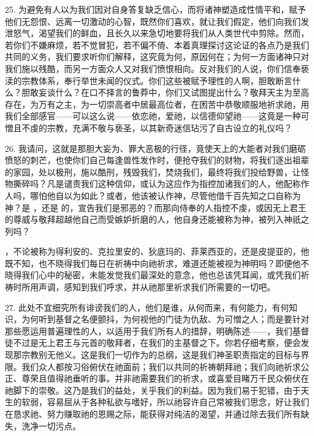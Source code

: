 25. 为避免有人以为我们因对自身答复缺乏信心，而将诸神塑造成性情平和，赋予他们无怨恨、远离一切激动的心智，既然你们喜欢，就让我们假定，他们向我们发泄怒气，渴望我们的鲜血，且长久以来急切地要将我们从人类世代中剪除。然而，若你们不嫌麻烦，若不觉冒犯，若不偏不倚、本着真理探讨这论证的各点乃是我们共同的义务，我们要求听你们解释，这究竟为何，原因何在；为何一方面诸神只对我们施以残酷，而另一方面众人又对我们愤恨相向。反对我们的人说，你们信奉亵渎的宗教体系，奉行举世未闻的仪式。你们这些被赋予理性的人啊，胆敢断言什么？胆敢妄谈什么？在口不择言的鲁莽中，你们又试图提出什么？敬拜天主为至高存在，为万有之主，为一切崇高者中居最高位者，在困苦中恭敬顺服地祈求祂，用我们全部感官——可以这么说——依恋祂，爱祂，以信德仰望祂——这竟是一种可憎且不虔的宗教，充满不敬与亵圣，以其新奇迷信玷污了自古设立的礼仪吗？\par

26. 我请问，这就是那胆大妄为、罪大恶极的行径，竟使天上的大能者对我们磨砺愤怒的刺芒，也使你们自己每逢兽性发作时，便抢夺我们的财物，将我们逐出祖辈的家园，处以极刑，施以酷刑，残毁我们，焚烧我们，最终将我们投给野兽，让怪物撕碎吗？凡是谴责我们这种信仰，或认为这应作为指控加诸我们的人，他配称作人吗，哪怕他自以为如此？或者，他该被认作神，尽管他借千百先知之口自称为神？是 ，还是 的，宣告我们是邪恶的？而那向侍奉的人指控不虔，或因无上君王的尊威与敬拜超越他自己而受嫉妒折磨的人，他自身还能被称为神，被列入神祇之列吗？\par

，不论被称为得利安的、克拉里安的、狄底玛的、菲莱西亚的，还是皮提亚的，他既不知，也不晓得我们每日在祈祷中向祂祈求，难道还能被视为神明吗？即便他不晓得我们心中的秘密，未能发觉我们最深处的意念，他也总该凭耳闻，或凭我们祈祷时所用声调，感知到我们呼求，并从祂那里祈求我们所需要的一切吧。\par

27. 此处不宜细究所有诽谤我们的人，他们是谁，从何而来，有何能力，有何知识，为何听到基督之名便颤抖，为何视他的门徒为仇敌、为可憎之人；而是要针对那些愿运用普遍理性的人，以适用于我们所有人的措辞，明确陈述——，我们基督徒不过是无上君王与元首的敬拜者，在我们的主基督之下。你若仔细考察，便会发现那宗教别无他义。这是我们一切作为的总纲，这是我们神圣职责指定的目标与界限。我们众人都按习俗俯伏在祂面前；我们以共同的祈祷朝拜祂；我们向祂祈求公正、尊荣且值得祂垂听的事。并非祂需要我们的祈求，或喜爱目睹万千民众俯伏在祂脚下的崇敬。这乃是我们的益处，关乎我们的利益。因为我们易于犯错，由于天生的软弱，容易屈从于各种私欲与嗜好，所以祂容许自己常被我们思念，好让我们在恳求祂、努力赚取祂的恩赐之际，能获得对纯洁的渴望，并通过除去我们所有缺失，洗净一切污点。\par

